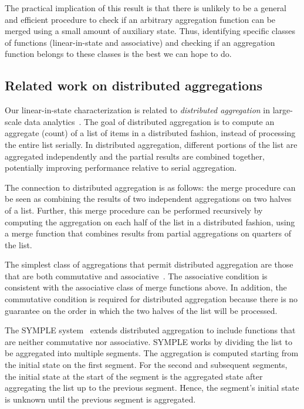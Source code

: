 The practical implication of this result is that there is unlikely to be a
general and efficient procedure to check if an arbitrary aggregation function
can be merged using a small amount of auxiliary state. Thus, identifying
specific classes of functions (\eg linear-in-state and associative) and
checking if an aggregation function belongs to these classes is the best we can
hope to do.

\subsection{Related work on distributed aggregations} Our linear-in-state
characterization is related to {\em distributed aggregation} in large-scale
data analytics~\cite{symple, distagg}. The goal of distributed aggregation is
to compute an aggregate (\eg count) of a list of items in a distributed
fashion, instead of processing the entire list serially. In distributed
aggregation, different portions of the list are aggregated independently and
the partial results are combined together, potentially improving performance
relative to serial aggregation.

The connection to distributed aggregation is as follows: the merge procedure
can be seen as combining the results of two independent aggregations on two
halves of a list.  Further, this merge procedure can be performed recursively
by computing the aggregation on each half of the list in a distributed fashion,
 \ie using a merge function that combines results from partial aggregations on
quarters of the list.

The simplest class of aggregations that permit distributed aggregation are
those that are both commutative and associative~\cite{distagg}. The associative
condition is consistent with the associative class of merge functions above. In
addition, the commutative condition is required for distributed aggregation
because there is no guarantee on the order in which the two halves of the list
will be processed.

The SYMPLE system~\cite{symple} extends distributed aggregation to include
functions that are neither commutative nor associative.  SYMPLE works by
dividing the list to be aggregated into multiple segments. The aggregation is
computed starting from the initial state on the first segment.  For the second
and subsequent segments, the initial state at the start of the segment is the
aggregated state after aggregating the list up to the previous segment. Hence,
the segment's initial state is unknown until the previous segment is
aggregated.

